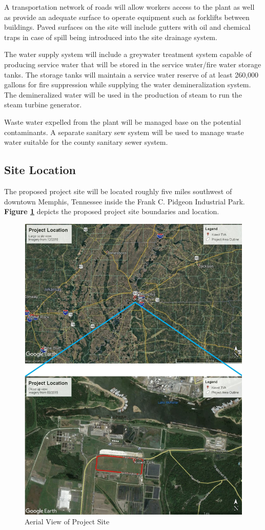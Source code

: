 \documentclass{ceri}
\begin{document}
A transportation network of roads will allow workers access to the plant as well as provide an adequate surface to operate equipment such as forklifts between buildings. Paved surfaces on the site will include gutters with oil and chemical traps in case of spill being introduced into the site drainage system.\\
\newline

The water supply system will include a greywater treatment system capable of producing service water that will be stored in the service water/fire water storage tanks. The storage tanks will maintain a service water reserve of at least 260,000 gallons for fire suppression while supplying the water demineralization system. The demineralized water will be used in the production of steam to run the steam turbine generator.\\
\newline

Waste water expelled from the plant will be managed base on the potential contaminants. A separate sanitary sew system will be used to manage waste water suitable for the county sanitary sewer system.


\newpage
\subsection{Site Location}
The proposed project site will be located roughly five miles southwest of downtown Memphis, Tennessee inside the Frank C. Pidgeon Industrial Park. \textbf{Figure \ref{fig:Location}} depicts the proposed project site boundaries and location. 
\begin{figure}[H]
    \centering
    \includegraphics[width=.85\textwidth]{images/Location.png}
    \caption{Aerial View of Project Site}
    \label{fig:Location}
\end{figure}
\end{document}
